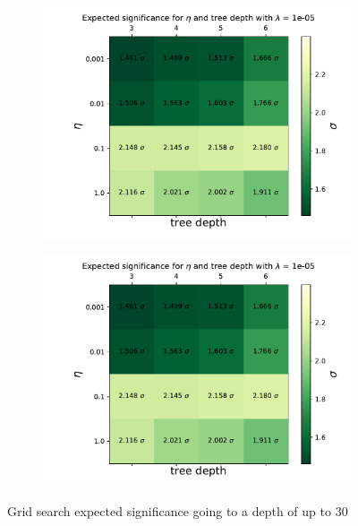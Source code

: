 \documentclass[14pt, a4paper]{book}
\begin{document}
\graphicspath{{../../../Plots/XGBoost/FULL/GRIDSEARCH_3-6}}
\begin{figure}[!ht]
	\centering
	\begin{subfigure}[b]{0.49\textwidth}
      \centering
      \includegraphics[width=1\textwidth]{Expected_significance.pdf}
   \end{subfigure}
   \hfill\graphicspath{{../../../Plots/XGBoost/FULL/GRIDSEARCH_24-30}}
   \begin{subfigure}[b]{0.49\textwidth}
      \centering
      \includegraphics[width=1\textwidth]{Expected_significance.pdf}
   \end{subfigure}
   \caption{Grid search expected significance going to a depth of up to 30}\label{fig:BDT_deep_sig}
\end{figure}
\end{document}
